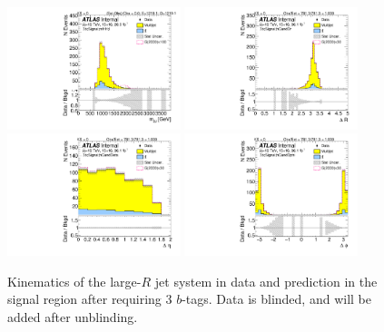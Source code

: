 \begin{figure}[htbp!]
\begin{center}
\includegraphics[width=0.45\textwidth,angle=-90]{figures/boosted/Signal/b77_ThreeTag_Signal_mHH_l_blind.pdf}
\includegraphics[width=0.45\textwidth,angle=-90]{figures/boosted/Signal/b77_ThreeTag_Signal_hCandDr_blind.pdf}\\
\includegraphics[width=0.45\textwidth,angle=-90]{figures/boosted/Signal/b77_ThreeTag_Signal_hCandDeta_blind.pdf}
\includegraphics[width=0.45\textwidth,angle=-90]{figures/boosted/Signal/b77_ThreeTag_Signal_hCandDphi_blind.pdf}
  \caption{Kinematics of the large-$R$ jet system in data and prediction in the signal region after requiring 3 $b$-tags. Data is blinded, and will be added after unblinding. }
  \label{fig:boosted-3b-signal-blind-ak10-system}
\end{center}
\end{figure}

